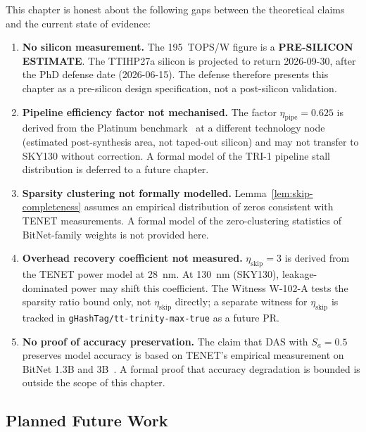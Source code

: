 This chapter is honest about the following gaps between the
theoretical claims and the current state of evidence:

\begin{enumerate}
  \item \textbf{No silicon measurement.}
        The 195~TOPS/W figure is a \textbf{PRE-SILICON ESTIMATE}.
        The TTIHP27a silicon is projected to return 2026-09-30, after
        the PhD defense date (2026-06-15).
        The defense therefore presents this chapter as a pre-silicon
        design specification, not a post-silicon validation.

  \item \textbf{Pipeline efficiency factor not mechanised.}
        The factor $\eta_{\mathrm{pipe}} = 0.625$ is derived from
        the Platinum benchmark~\cite{platinum2025} at a different
        technology node (estimated post-synthesis area, not taped-out
        silicon) and may not transfer to SKY130 without correction.
        A formal model of the TRI-1 pipeline stall distribution
        is deferred to a future chapter.

  \item \textbf{Sparsity clustering not formally modelled.}
        Lemma~\ref{lem:skip-completeness} assumes an empirical
        distribution of zeros consistent with TENET measurements.
        A formal model of the zero-clustering statistics of BitNet-family
        weights is not provided here.

  \item \textbf{Overhead recovery coefficient not measured.}
        $\eta_{\mathrm{skip}} = 3$ is derived from the TENET power
        model at 28~nm.
        At 130~nm (SKY130), leakage-dominated power may shift this
        coefficient.
        The Witness W-102-A tests the sparsity ratio bound only, not
        $\eta_{\mathrm{skip}}$ directly; a separate witness for
        $\eta_{\mathrm{skip}}$ is tracked in
        \texttt{gHashTag/tt-trinity-max-true} as a future PR.

  \item \textbf{No proof of accuracy preservation.}
        The claim that DAS with $S_a = 0.5$ preserves model accuracy
        is based on TENET's empirical measurement on BitNet 1.3B and
        3B~\cite{huang2025tenet}.
        A formal proof that accuracy degradation is bounded is outside
        the scope of this chapter.
\end{enumerate}

\subsection{Planned Future Work}
\label{subsec:ch79-future-work}

